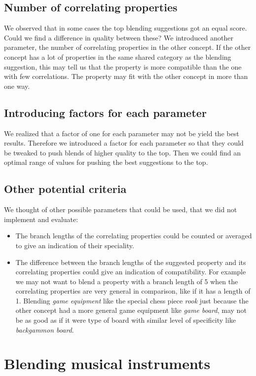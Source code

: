 \subsection{Number of correlating properties}
We observed that in some cases the top blending suggestions got an equal score. Could we find a difference in quality between these? We introduced another parameter, the number of correlating properties in the other concept. If the other concept has a lot of properties in the same shared category as the blending suggestion, this may tell us that the property is more compatible than the one with few correlations. The property may fit with the other concept in more than one way.

\subsection{Introducing factors for each parameter}
We realized that a factor of one for each parameter may not be yield the best results. Therefore we introduced a factor for each parameter so that they could be tweaked to push blends of higher quality to the top. Then we could find an optimal range of values for pushing the best suggestions to the top.

\subsection{Other potential criteria}
We thought of other possible parameters that could be used, that we did not implement and evaluate:
\begin{itemize}
\item The branch lengths of the correlating properties could be counted or averaged to give an indication of their speciality.
\item The difference between the branch lengths of the suggested property and its correlating properties could give an indication of compatibility. For example we may not want to blend a property with a branch length of 5 when the correlating properties are very general in comparison, like if it has a length of 1. Blending \emph{game equipment} like the special chess piece \emph{rook} just because the other concept had a more general game equipment like \emph{game board}, may not be as good as if it were type of board with similar level of specificity like \emph{backgammon board}.
\end{itemize}

\section{Blending musical instruments}


